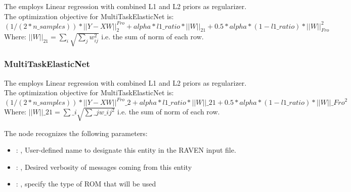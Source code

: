  The  employs                         Linear regression with combined
 L1 and L2 priors as regularizer.                         The optimization objective for
 MultiTaskElasticNet is:                         $(1 / (2 * n\_samples)) * ||Y - XW||^{Fro}_2
 + alpha * l1\_ratio * ||W||_{21}                         + 0.5 * alpha * (1 - l1\_ratio) *
 ||W||_{Fro}^2$                         \\Where:                         $||W||_{21} = \sum_i
 \sqrt{\sum_j w_{ij}^2}$                         i.e. the sum of norm of each row.

\subsubsection{MultiTaskElasticNet}
  The  employs                         Linear regression with combined
  L1 and L2 priors as regularizer.                         The optimization objective for
  MultiTaskElasticNet is:                         $(1 / (2 * n\_samples)) * ||Y - XW||^{Fro}\_2
  + alpha * l1\_ratio * ||W||\_{21}                         + 0.5 * alpha * (1 - l1\_ratio) *
  ||W||\_{Fro}^2$                         \\Where:                         $||W||\_{21} = \sum\_i
  \sqrt{\sum\_j w\_{ij}^2}$                         i.e. the sum of norm of each row.

  The  node recognizes the following parameters:
    \begin{itemize}
      \item {}: , 
        User-defined name to designate this entity in the RAVEN input file.
      \item {}: , 
        Desired verbosity of messages coming from this entity
      \item {}: , 
        specify the type of ROM that will be used
  \end{itemize}

